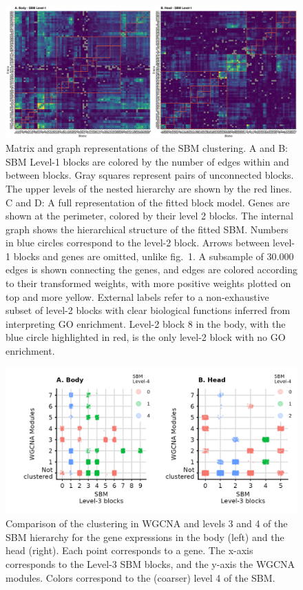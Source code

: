 \documentclass[
]{article}
\begin{document}
\begin{figure}
\centering
\includegraphics{figures/SBM_Ematrix.png}
\caption{Matrix and graph representations of the SBM clustering. A and
B: SBM Level-1 blocks are colored by the number of edges within and
between blocks. Gray squares represent pairs of unconnected blocks. The
upper levels of the nested hierarchy are shown by the red lines. C and
D: A full representation of the fitted block model. Genes are shown at
the perimeter, colored by their level 2 blocks. The internal graph shows
the hierarchical structure of the fitted SBM. Numbers in blue circles
correspond to the level-2 block. Arrows between level-1 blocks and genes
are omitted, unlike fig.~1. A subsample of 30.000 edges is shown
connecting the genes, and edges are colored according to their
transformed weights, with more positive weights plotted on top and more
yellow. External labels refer to a non-exhaustive subset of level-2
blocks with clear biological functions inferred from interpreting GO
enrichment. Level-2 block 8 in the body, with the blue circle
highlighted in red, is the only level-2 block with no GO
enrichment.}\label{fig:Emats}
\end{figure}

\begin{figure}
\centering
\includegraphics{figures/WGCNA_comparison.png}
\caption{Comparison of the clustering in WGCNA and levels 3 and 4 of the
SBM hierarchy for the gene expressions in the body (left) and the head
(right). Each point corresponds to a gene. The x-axis corresponds to the
Level-3 SBM blocks, and the y-axis the WGCNA modules. Colors correspond
to the (coarser) level 4 of the SBM.}\label{fig:wgcna_compare}
\end{figure}
\end{document}

